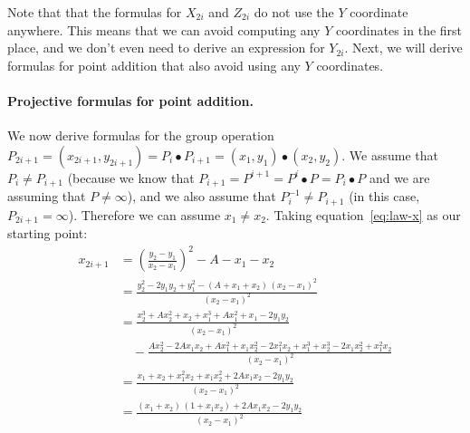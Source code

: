 \documentclass[manuscript]{acmart}
\begin{document}
Note that that the formulas for $X_{2i}$ and $Z_{2i}$ do not use the $Y$ coordinate anywhere.
This means that we can avoid computing any $Y$ coordinates in the first place, and we don't even need to derive an expression for $Y_{2i}$.
Next, we will derive formulas for point addition that also avoid using any $Y$ coordinates.

\paragraph{Projective formulas for point addition.}

We now derive formulas for the group operation
$P_{2i+1} = (x_{2i+1}, y_{2i+1}) = P_i \bullet P_{i+1} = (x_1, y_1) \bullet (x_2, y_2)$.
We assume that $P_i \ne P_{i+1}$ (because we know that $P_{i+1} = P^{i+1} = P^i \bullet P = P_i \bullet P$ and we are assuming that $P \ne \infty$), and we also assume that $P_i^{-1} \ne P_{i+1}$ (in this case, $P_{2i+1} = \infty$).
Therefore we can assume $x_1 \neq x_2$.
Taking equation~\eqref{eq:law-x} as our starting point:
\begin{align}
x_{2i+1} &= \left(\frac{y_2 - y_1}{x_2 - x_1}\right)^2 - A - x_1 - x_2 \nonumber\\[5pt]
&= \frac{y_2^2 - 2y_1 y_2 + y_1^2 - (A + x_1 + x_2)\,(x_2 - x_1)^2}{(x_2 - x_1)^2} \nonumber\\[5pt]
&= \frac{x_2^3 + Ax_2^2 + x_2 + x_1^3 + Ax_1^2 + x_1 - 2y_1 y_2}{(x_2 - x_1)^2} \nonumber\\
    &\quad - \frac{Ax_2^2 - 2Ax_1 x_2 + Ax_1^2 + x_1 x_2^2 - 2 x_1^2 x_2 + x_1^3 + x_2^3 - 2x_1 x_2^2 + x_1^2 x_2}{(x_2 - x_1)^2} \nonumber\\[5pt]
&= \frac{x_1 + x_2 + x_1^2 x_2 + x_1 x_2^2 + 2A x_1 x_2 - 2y_1 y_2}{(x_2 - x_1)^2} \nonumber\\[5pt]
&= \frac{(x_1 + x_2)\,(1 + x_1 x_2) + 2A x_1 x_2 - 2y_1 y_2}{(x_2 - x_1)^2} \label{eq:add-x}
\end{align}
\end{document}
